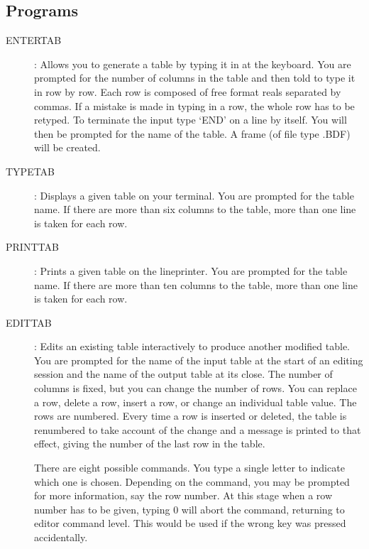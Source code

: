 \subsection {Programs}
\begin{description}
\item [ENTERTAB]:
Allows you to generate a table by typing it in at the keyboard.
You are prompted for the number of columns in the table and then told to type
it in row by row.
Each row is composed of free format reals separated by commas.
If a mistake is made in typing in a row, the whole row has to be retyped.
To terminate the input type `END' on a line by itself.
You will then be prompted for the name of the table.
A frame (of file type .BDF) will be created.
\item [TYPETAB]:
Displays a given table on your terminal.
You are prompted for the table name.
If there are more than six columns to the table, more than one line is taken
for each row.
\item [PRINTTAB]:
Prints a given table on the lineprinter.
You are prompted for the table name.
If there are more than ten columns to the table, more than one line is taken
for each row.
\item [EDITTAB]:
Edits an existing table interactively to produce another modified table.
You are prompted for the name of the input table at the start of an editing
session and the name of the output table at its close.
The number of columns is fixed, but you can change the number of rows.
You can replace a row, delete a row, insert a row, or change an individual
table value.
The rows are numbered.
Every time a row is inserted or deleted, the table is renumbered to take account
of the change and a message is printed to that effect, giving the number of the
last row in the table.

There are eight possible commands.
You type a single letter to indicate which one is chosen.
Depending on the command, you may be prompted for more information, say the row
number.
At this stage when a row number has to be given, typing 0 will abort the
command, returning to editor command level.
This would be used if the wrong key was pressed accidentally.


\end{description}
